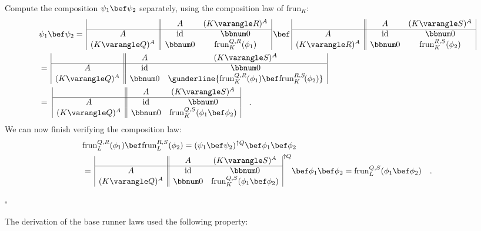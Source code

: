 Compute the composition $\psi_{1}\bef\psi_{2}$ separately, using
the composition law of $\text{frun}_{K}$:
\begin{align*}
 & \psi_{1}\bef\psi_{2}=\,\begin{array}{|c||cc|}
 & A & (K\varangle R)^{A}\\
\hline A & \text{id} & \bbnum 0\\
(K\varangle Q)^{A} & \bbnum 0 & \text{frun}_{K}^{Q,R}(\phi_{1})
\end{array}\,\bef\,\begin{array}{|c||cc|}
 & A & (K\varangle S)^{A}\\
\hline A & \text{id} & \bbnum 0\\
(K\varangle R)^{A} & \bbnum 0 & \text{frun}_{K}^{R,S}(\phi_{2})
\end{array}\\
 & =\,\begin{array}{|c||cc|}
 & A & (K\varangle S)^{A}\\
\hline A & \text{id} & \bbnum 0\\
(K\varangle Q)^{A} & \bbnum 0 & \gunderline{\text{frun}_{K}^{Q,R}(\phi_{1})\bef\text{frun}_{K}^{R,S}\!(\phi_{2})}
\end{array}\\
 & =\,\,\begin{array}{|c||cc|}
 & A & (K\varangle S)^{A}\\
\hline A & \text{id} & \bbnum 0\\
(K\varangle Q)^{A} & \bbnum 0 & \text{frun}_{K}^{Q,S}(\phi_{1}\bef\phi_{2})
\end{array}\quad.
\end{align*}
We can now finish verifying the composition law:
\begin{align*}
 & \text{frun}_{L}^{Q,R}(\phi_{1})\bef\text{frun}_{L}^{R,S}(\phi_{2})=(\psi_{1}\bef\psi_{2})^{\uparrow Q}\bef\phi_{1}\bef\phi_{2}\\
 & =\,\begin{array}{|c||cc|}
 & A & (K\varangle S)^{A}\\
\hline A & \text{id} & \bbnum 0\\
(K\varangle Q)^{A} & \bbnum 0 & \text{frun}_{K}^{Q,S}(\phi_{1}\bef\phi_{2})
\end{array}^{\uparrow Q}\bef\phi_{1}\bef\phi_{2}=\text{frun}_{L}^{Q,S}(\phi_{1}\bef\phi_{2})\quad.
\end{align*}

$\square$

The derivation of the base runner laws used the following property:

